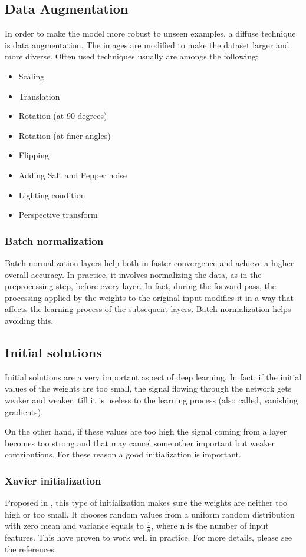 \subsection{Data Augmentation}
In order to make the model more robust to unseen examples, a diffuse technique is data augmentation. The images are modified to make the dataset larger and more diverse. Often used techniques usually are amongs the following: 
\begin{itemize}
\item  Scaling
\item Translation
\item Rotation (at 90 degrees)
\item Rotation (at finer angles)
\item Flipping
\item  Adding Salt and Pepper noise
\item Lighting condition
\item Perspective transform
\end{itemize} 


\subsubsection{Batch normalization}
Batch normalization layers help both in faster convergence and achieve a higher overall accuracy. In practice, it involves normalizing the data, as in the preprocessing step, before every layer.
In fact, during the forward pass, the processing applied by the weights to the original input modifies it in a way that affects the learning process of the subsequent layers. Batch normalization helps avoiding this.  

\subsection{Initial solutions}
Initial solutions are a very important aspect of deep learning. In fact, if the initial values of the weights are too small, the signal flowing through the network gets weaker and weaker, till it is useless to the learning process (also called, vanishing gradients). 

On the other hand, if these values are too high the signal coming from a layer becomes too strong and that may cancel some other important but weaker contributions. For these reason a good initialization is important. 


\subsubsection{Xavier initialization}
Proposed in \parencite{xavier}, this type of initialization makes sure the weights are neither too high or too small. It chooses random values from a uniform random distribution with zero mean and variance equals to $\frac{1}{n}$, where n is the number of input features. This have proven to work well in practice. For more details, please see the references. 


